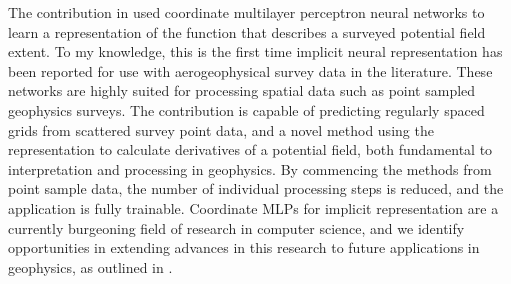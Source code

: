 The contribution in  used coordinate multilayer perceptron neural networks to learn a representation of the function that describes a surveyed potential field extent.
To my knowledge, this is the first time implicit neural representation has been reported for use with aerogeophysical survey data in the literature.
These networks are highly suited for processing spatial data such as point sampled geophysics surveys.
The contribution is capable of predicting regularly spaced grids from scattered survey point data, and a novel method using the representation to calculate derivatives of a potential field, both fundamental to interpretation and processing in geophysics.
By commencing the methods from point sample data, the number of individual processing steps is reduced, and the application is fully trainable.
Coordinate MLPs for implicit representation are a currently burgeoning field of research in computer science, and we identify opportunities in extending advances in this research to future applications in geophysics, as outlined in .


% 